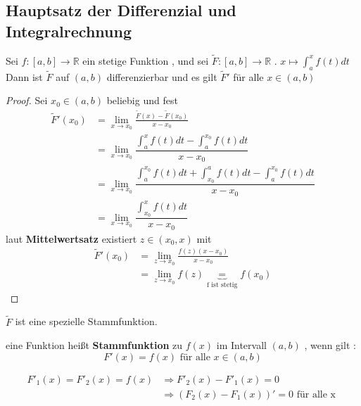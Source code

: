 \subsection{Hauptsatz der Differenzial und Integralrechnung }
Sei $ f : [a , b] \rightarrow \mathbb{R} $ ein stetige Funktion , und sei $ \widetilde{F} : [a , b] \rightarrow \mathbb{R	}$ . $ x \longmapsto \int_{a}^{x} f(t) dt $
Dann ist $\widetilde{F}$ auf $(a,b)$ differenzierbar  und es gilt $\widetilde{F}'$ für alle $x \in (a , b)$
\begin{proof}
Sei $x_0 \in (a,b)$ beliebig und fest 
\begin{align*}
\widetilde{F}'(x_0) &= \lim_{x \to x_0 }{\frac{\widetilde{F}(x)-\widetilde{F}(x_0)}{x - x_0}}\\
&= \lim_{x \to x_0 }{\dfrac{\int_{a}^{x} f(t) dt - \int_{a}^{x_0} f(t) dt}{x - x_0}}\\
&= \lim_{x \to x_0 }{\dfrac{\int_{a}^{x_0} f(t) dt + \int_{x_0}^{a} f(t) dt - \int_{a}^{x_0} f(t) dt}{x - x_0}}\\
&= \lim_{x \to x_0 }{\dfrac{\int_{x_0}^{x} f(t) dt}{x -x_0}}
\end{align*}
laut \textbf{Mittelwertsatz} existiert $z \in (x_0,x)$ mit
\begin{align*} 
 \widetilde{F}'(x_0) &= \lim_{ z \to x_0}{\frac{f(z)( x - x_0 )}{ x - x_0}}\\
&= \lim_{z \to x_0}{f(z)} \underbrace{=}_{\text{f ist stetig}} f(x_0) 
\end{align*}
\end{proof}
\begin{remark}
$\widetilde{F}$ ist eine spezielle Stammfunktion.
\end{remark}
\begin{definition}[Stammfunktion]
eine Funktion heißt \textbf{Stammfunktion} zu $f(x)$ im Intervall $(a , b)$ , wenn gilt :
\[ F'(x) = f(x) \text{ für alle } x \in (a , b) \]
\end{definition}
\begin{remark}
\begin{align*}
F'_1(x) = F'_2(x) = f(x) &\Rightarrow 
F'_2(x)-F'_1(x) = 0\\
&\Rightarrow (F_2(x) - F_1(x))'=0 \text{ für alle x }
\end{align*}
\end{remark}
